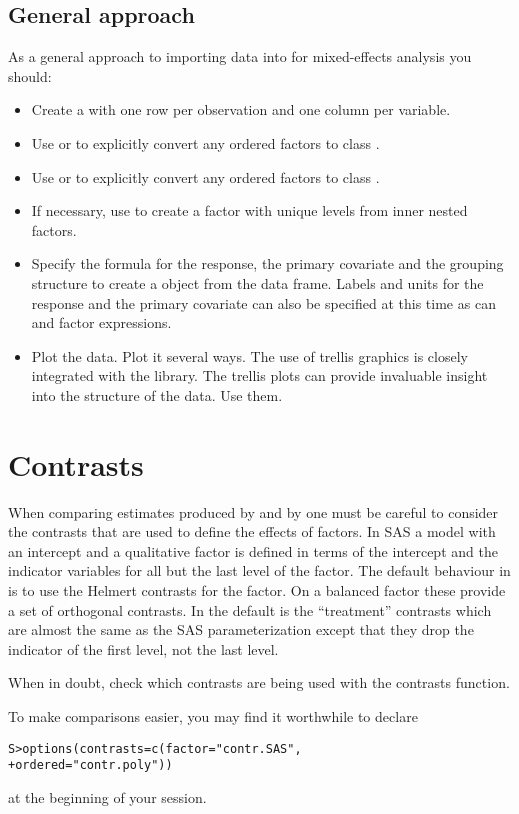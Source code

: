 \documentclass[]{article}
\newenvironment{Example}%
{\begin{list}{}{\setlength{\leftmargin}{.5\parindent}}%
  \item\begin{alltt}\small}%
    {\end{alltt}\end{list}}
\begin{document}
\subsection{General approach}
\label{sec:generalApproach}

As a general approach to importing data into \s{} for mixed-effects
analysis you should:
\begin{itemize}
\item Create a  with one row per observation and one
  column per variable.
\item Use  or  to explicitly convert any
  ordered factors to class .
\item Use  or  to explicitly convert any
  ordered factors to class .
\item If necessary, use  to create a factor with unique
  levels from inner nested factors.
\item Specify the formula for the response, the primary covariate and
  the grouping structure to create a  object from the
  data frame.  Labels and units for the response and the primary
  covariate can also be specified at this time as can  and
   factor expressions.
\item Plot the data.  Plot it several ways.  The use of trellis
  graphics is closely integrated with the  library.  The
  trellis plots can provide invaluable insight into the structure of
  the data.  Use them.
\end{itemize}

\section{Contrasts}
\label{sec:contrasts}

When comparing estimates produced by  and by
 one must be careful to consider the contrasts that are
used to define the effects of factors.  In \textsf{SAS} a model with
an intercept and a qualitative factor is defined in terms of the
intercept and the indicator variables for all but the last level of
the factor.  The default behaviour in \s{} is to use the Helmert
contrasts for the factor.  On a balanced factor these provide a set of 
orthogonal contrasts.  In \R{} the default is the ``treatment''
contrasts which are almost the same as the SAS parameterization except 
that they drop the indicator of the first level, not the last level.

When in doubt, check which contrasts are being used with the
\textsf{contrasts} function.

To make comparisons easier, you may find it worthwhile to declare
\begin{Example}
S> options(contrasts = c(factor = "contr.SAS",
+                        ordered = "contr.poly"))
\end{Example}
at the beginning of your session.


\end{document}

